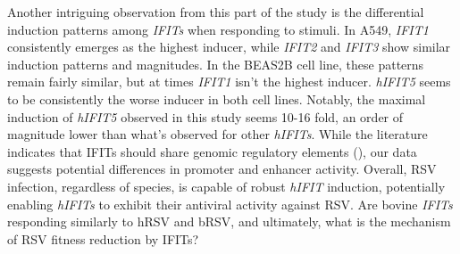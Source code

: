 Another intriguing observation from this part of the study is the differential induction patterns among \textit{IFITs} when responding to stimuli. In A549, \textit{IFIT1} consistently emerges as the highest inducer, while \textit{IFIT2} and \textit{IFIT3} show similar induction patterns and magnitudes. In the BEAS2B cell line, these patterns remain fairly similar, but at times \textit{IFIT1} isn't the highest inducer. \textit{hIFIT5} seems to be consistently the worse inducer in both cell lines. Notably, the maximal induction of \textit{hIFIT5} observed in this study seems 10-16 fold, an order of magnitude lower than what's observed for other \textit{hIFITs}. While the literature indicates that IFITs should share genomic regulatory elements (\cite{Lou2009Ifr-9/stat2Stat1}), our data suggests potential differences in promoter and enhancer activity. Overall, RSV infection, regardless of species, is capable of robust \textit{hIFIT} induction, potentially enabling \textit{hIFITs} to exhibit their antiviral activity against RSV. Are bovine \textit{IFITs} responding similarly to hRSV and bRSV, and ultimately, what is the mechanism of RSV fitness reduction by IFITs?


